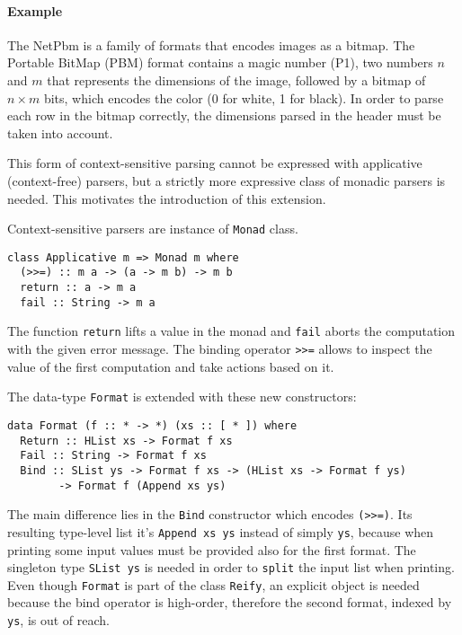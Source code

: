 \documentclass[../Thesis.tex]{subfiles}
\begin{document}
\paragraph{Example}
The NetPbm is a family of formats that encodes images as a bitmap. 
The Portable BitMap (PBM) format contains a magic number (P1), two numbers $n$ and $m$ that represents the dimensions of the image, followed by a bitmap of $n \times m$ bits, which encodes the color (0 for white, 1 for black). In order to parse each row in the bitmap correctly, the dimensions parsed in the header must be taken into account.

This form of context-sensitive parsing cannot be expressed with applicative (context-free) parsers, but a strictly more expressive class of monadic parsers is needed. This motivates the introduction of this extension.

Context-sensitive parsers are instance of \texttt{Monad} class.

\begin{verbatim}
class Applicative m => Monad m where
  (>>=) :: m a -> (a -> m b) -> m b
  return :: a -> m a
  fail :: String -> m a
\end{verbatim}

The function \texttt{return} lifts a value in the monad and \texttt{fail}
aborts the computation with the given error message.
The binding operator \texttt{>>=} allows to inspect the value of the first computation and take actions based on it.

The data-type \texttt{Format} is extended with these new constructors:

\begin{verbatim}
data Format (f :: * -> *) (xs :: [ * ]) where
  Return :: HList xs -> Format f xs
  Fail :: String -> Format f xs
  Bind :: SList ys -> Format f xs -> (HList xs -> Format f ys) 
        -> Format f (Append xs ys)
\end{verbatim}

The main difference lies in the \texttt{Bind} constructor which encodes \texttt{(>>=)}. Its resulting type-level list it's \texttt{Append xs ys}
instead of simply \texttt{ys}, because when printing some input values 
must be provided also for the first format.
The singleton type \texttt{SList ys} is needed in order to \texttt{split} 
the input list  when printing. Even though \texttt{Format} is part of the class
\texttt{Reify}, an explicit object is needed because the bind operator is high-order, therefore the second format, indexed by \texttt{ys}, is out of reach.
\end{document}
